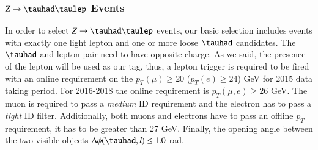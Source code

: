\subsubsection{$Z\to\tauhad\taulep$ Events}\label{sec3.3.1}
In order to select $Z\to\tauhad\taulep$ events, our basic selection includes events with exactly one light lepton and one or more loose $\tauhad$ candidates. The $\tauhad$ and lepton pair need to have opposite charge. As we said, the presence of the lepton will be used as our tag, thus, a lepton trigger is required to be fired with an online requirement on the $p_{T}(\mu)\geq 20$ ($p_{T}(e)\geq 24$) GeV for 2015 data taking period. For 2016-2018 the online requirement is $p_{T}(\mu,e)\geq 26$ GeV. The muon is required to pass a \textit{medium} ID requirement and the electron has to pass a \textit{tight} ID filter. Additionally, both muons and electrons have to pass an offline $p_T$ requirement, it has to be greater than 27 GeV. Finally, the opening angle between the two visible objects $\Delta\phi(\tauhad,l)\leq 1.0$ rad.

